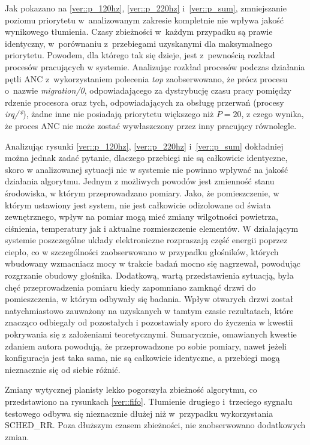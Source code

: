 Jak pokazano na \ref{ver::p_120hz}, \ref{ver::p_220hz} i~\ref{ver::p_sum},
zmniejszanie poziomu priorytetu w~analizowanym zakresie kompletnie nie wpływa
jakość wynikowego tłumienia. Czasy zbieżności w~każdym przypadku są prawie
identyczny, w~porównaniu z~przebiegami uzyskanymi dla maksymalnego priorytetu.
Powodem, dla którego tak się dzieje, jest z~pewnością rozkład procesów
pracujących w systemie. Analizując rozkład procesów podczas działania pętli ANC
z~wykorzystaniem polecenia \textit{top} zaobserwowano, że prócz procesu o~nazwie
\textit{migration/0}, odpowiadającego za dystrybucję czasu pracy pomiędzy
rdzenie procesora oraz tych, odpowiadających za obsługę przerwań (procesy
\textit{irq/*}), żadne inne nie posiadają priorytetu większego niż $P = 20$, z
czego wynika, że proces ANC nie może zostać wywłaszczony przez inny pracujący
równolegle. \par Analizując rysunki \ref{ver::p_120hz}, \ref{ver::p_220hz}
i~\ref{ver::p_sum} dokładniej można jednak zadać pytanie, dlaczego przebiegi nie
są całkowicie identyczne, skoro w analizowanej sytuacji nic w systemie nie
powinno wpływać na jakość działania algorytmu. Jednym z możliwych powodów jest
zmienność stanu środowiska, w którym przeprowadzano pomiary. Jako, że
pomieszczenie, w którym ustawiony jest system, nie jest całkowicie odizolowane
od świata zewnętrznego, wpływ na pomiar mogą mieć zmiany wilgotności powietrza,
ciśnienia, temperatury jak i aktualne rozmieszczenie elementów. W działającym
systemie poszczególne układy elektroniczne rozpraszają część energii poprzez
ciepło, co w szczególności zaobserwowano w przypadku głośników, których
wbudowany wzmacniacz mocy w trakcie badań mocno się nagrzewał, powodując
rozgrzanie obudowy głośnika. Dodatkową, wartą przedstawienia sytuacją, była chęć
przeprowadzenia pomiaru kiedy zapomniano zamknąć drzwi do pomieszczenia, w
którym odbywały się badania. Wpływ otwarych drzwi został natychmiastowo
zauważony na uzyskanych w tamtym czasie rezultatach, które znacząco odbiegały od
pozostałych i pozostawiały sporo do życzenia w kwestii pokrywania się z
założeniami teoretycznymi. Sumarycznie, omawianych kwestie zdaniem autora
powodują, że przeprowadzone po sobie pomiary, nawet jeżeli konfiguracja jest
taka sama, nie są całkowicie identyczne, a przebiegi mogą nieznacznie się od
siebie różnić. \par Zmiany wytycznej planisty lekko pogorszyła zbieżność
algorytmu, co przedstawiono na rysunkach \ref{ver::fifo}. Tłumienie drugiego
i~trzeciego sygnału testowego odbywa się nieznacznie dłużej niż w~przypadku
wykorzystania SCHED\_RR. Poza dłuższym czasem zbieżności, nie zaobserwowano
dodatkowych zmian.

